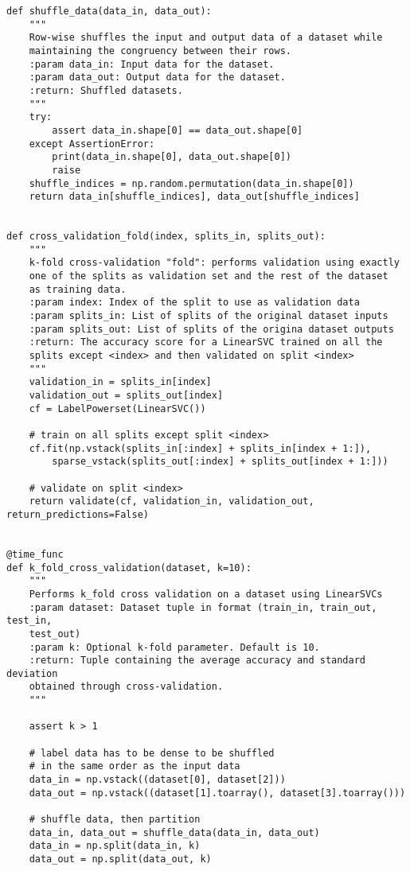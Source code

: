 \documentclass{kthreport}
\theoremstyle{definition}
\begin{document}
\printbibliography
\newpage
\begin{lstlisting}[style=MyPython]
def shuffle_data(data_in, data_out):
	"""
	Row-wise shuffles the input and output data of a dataset while
	maintaining the congruency between their rows.
	:param data_in: Input data for the dataset.
	:param data_out: Output data for the dataset.
	:return: Shuffled datasets.
	"""
	try:
		assert data_in.shape[0] == data_out.shape[0]
	except AssertionError:
		print(data_in.shape[0], data_out.shape[0])
		raise
	shuffle_indices = np.random.permutation(data_in.shape[0])
	return data_in[shuffle_indices], data_out[shuffle_indices]


def cross_validation_fold(index, splits_in, splits_out):
	"""
	k-fold cross-validation "fold": performs validation using exactly
	one of the splits as validation set and the rest of the dataset
	as training data.
	:param index: Index of the split to use as validation data
	:param splits_in: List of splits of the original dataset inputs
	:param splits_out: List of splits of the origina dataset outputs
	:return: The accuracy score for a LinearSVC trained on all the
	splits except <index> and then validated on split <index>
	"""
	validation_in = splits_in[index]
	validation_out = splits_out[index]
	cf = LabelPowerset(LinearSVC())
	
	# train on all splits except split <index>
	cf.fit(np.vstack(splits_in[:index] + splits_in[index + 1:]),
		sparse_vstack(splits_out[:index] + splits_out[index + 1:]))
	
	# validate on split <index>
	return validate(cf, validation_in, validation_out, return_predictions=False)


@time_func
def k_fold_cross_validation(dataset, k=10):
	"""
	Performs k_fold cross validation on a dataset using LinearSVCs
	:param dataset: Dataset tuple in format (train_in, train_out, test_in,
	test_out)
	:param k: Optional k-fold parameter. Default is 10.
	:return: Tuple containing the average accuracy and standard deviation
	obtained through cross-validation.
	"""
	
	assert k > 1
	
	# label data has to be dense to be shuffled
	# in the same order as the input data
	data_in = np.vstack((dataset[0], dataset[2]))
	data_out = np.vstack((dataset[1].toarray(), dataset[3].toarray()))
	
	# shuffle data, then partition
	data_in, data_out = shuffle_data(data_in, data_out)
	data_in = np.split(data_in, k)
	data_out = np.split(data_out, k)
	

\end{lstlisting}
\end{document}
